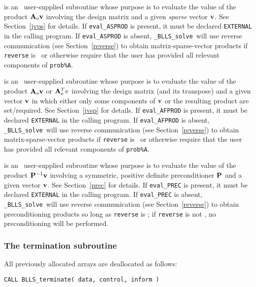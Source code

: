 \documentclass{galahad}
\newcommand{\packagename}{BLLS}
\newcommand{\fullpackagename}{\libraryname\_\packagename}
\newcommand{\solver}{{\tt \fullpackagename\_solve}}
\begin{document}
\begin{description}
 is an \optional\
user-supplied subroutine whose purpose is to evaluate the value of the
product ${\mathbf{A}}_o {\mathbf{v}}$  involving the design matrix and a given {\em sparse}
vector ${\mathbf{v}}$.
See Section~\ref{jvps} for details.
If {\tt eval\_ASPROD} is present,
it must be declared {\tt EXTERNAL} in the calling program.
If {\tt eval\_ASPROD} is absent, \solver\ will use reverse communication
(see Section~\ref{reverse})
to obtain matrix-sparse-vector products if {\tt reverse} is \present\ or
otherwise require that the user has provided all relevant
components of {\tt prob\%A}.

 is an \optional\
user-supplied subroutine whose purpose is to evaluate the value of the
product ${\mathbf{A}}_o {\mathbf{v}}$ or ${\mathbf{A}}_o^T v$ involving the design matrix 
(and its transpose)
and a given vector ${\mathbf{v}}$ in which either only some components of ${\mathbf{v}}$ or
the resulting product are set/required.
See Section~\ref{jvsp} for details.
If {\tt eval\_AFPROD} is present,
it must be declared {\tt EXTERNAL} in the calling program.
If {\tt eval\_AFPROD} is absent, \solver\ will use reverse communication
(see Section~\ref{reverse})
to obtain matrix-sparse-vector products if {\tt reverse} is \present\ or
otherwise require that the user has provided all relevant
components of {\tt prob\%A}.

 is an \optional\
user-supplied subroutine whose purpose is to evaluate the value of the
product ${\mathbf{P}}^{-1} {\mathbf{v}}$ involving a symmetric, positive definite 
preconditioner ${\mathbf{P}}$ and a given vector ${\mathbf{v}}$.
See Section~\ref{prec} for details.
If {\tt eval\_PREC} is present,
it must be declared {\tt EXTERNAL} in the calling program.
If {\tt eval\_PREC} is absent, \solver\ will use reverse communication
(see Section~\ref{reverse})
to obtain preconditioning products so long as {\tt reverse} is \present;
if {\tt reverse} is not \present, no preconditioning will be performed.

\end{description}


\subsubsection{The  termination subroutine}
All previously allocated arrays are deallocated as follows:
\vspace*{1mm}

\hspace{8mm}
{\tt CALL \packagename\_terminate( data, control, inform )}
\end{document}
